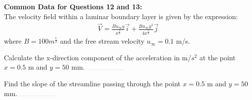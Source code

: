 \textbf{Common Data for Questions 12 and 13:}\\

The velocity field within a laminar boundary layer is given by the expression:
\begin{align*}
\vec{V} = \frac{Bu_{\infty}y}{x^{\frac{3}{2}}}\vec{i} + \frac{Bu_{\infty}y^{2}}{4x^{\frac{5}{2}}}\vec{j} 
\end{align*}
where $B = 100m^{\frac{1}{2}}$ and the free stream velocity $u_{\infty} = 0.1$ m/s.

\item Calculate the x-direction component of the acceleration in m/$s^2$ at the point $x = 0.5$ m and $y = 50$ mm.$\rule{2cm}{0.1pt}$
\hfill{}

\item Find the slope of the streamline passing through the point $x = 0.5$ m and $y = 50$ mm.$\rule{2cm}{0.1pt}$
\hfill{}

